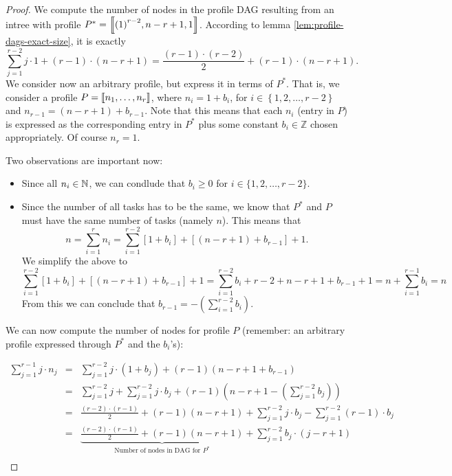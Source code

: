 \begin{proof}
  We compute the number of nodes in the profile DAG resulting from an intree with profile $P^*= \left\llbracket {(1)}^{r-2},n-r+1,1 \right\rrbracket$. According to lemma  \ref{lem:profile-dags-exact-size}, it is exactly
  \begin{equation*}
    \sum_{j=1}^{r-2} j\cdot 1 + (r-1)\cdot(n-r+1) = \frac{(r-1)\cdot(r-2)}{2} + (r-1)\cdot(n-r+1).
  \end{equation*}
  We consider now an arbitrary profile, but express it in terms of $P^*$. That is, we consider a profile $P=\left\llbracket n_1,\dots,n_r \right\rrbracket$, where $n_i = 1 + b_i$, for $i\in\left\{1,2,\dots,r-2\right\}$ and $n_{r-1} = (n-r+1) + b_{r-1}$. Note that this means that each $n_i$ (entry in $P$) is expressed as the corresponding entry in $P^*$ plus some constant $b_i\in\mathbb{Z}$ chosen appropriately. Of course $n_r = 1$.

  Two observations are important now:

  \begin{itemize}
  \item Since all $n_i \in \mathbb{N}$, we can condlude that $b_i \geq 0$ for $i\in\{1,2,\dots,r-2\}$.
  \item Since the number of all tasks has to be the same, we know that $P^*$ and $P$ must have the same number of tasks (namely $n$). This means that
    \begin{equation*}
      n = \sum_{i=1}^r n_i = \sum_{i=1}^{r-2} \left[ 1+b_i \right] + \left[(n-r+1)+b_{r-1} \right] + 1.
    \end{equation*}
    We simplify the above to
    \begin{equation*}
      \sum_{i=1}^{r-2} \left[ 1+b_i \right] + \left[(n-r+1)+b_{r-1} \right] + 1 =
      \sum_{i=1}^{r-2} b_i + r-2 + n-r+1+b_{r-1}+1 = 
      n + \sum_{i=1}^{r-1} b_i =
      n
    \end{equation*}
    From this we can conclude that $b_{r-1} = -(\sum_{i=1}^{r-2} b_i)$.
  \end{itemize}

  We can now compute the number of nodes for profile $P$ (remember: an arbitrary profile expressed through $P^*$ and the $b_i$'s):

  \begin{eqnarray*}
    \sum_{j=1}^{r-1} j \cdot n_j &=& \sum_{j=1}^{r-2} j\cdot (1+b_j) + (r-1)(n-r+1+b_{r-1}) \\
    &=& \sum_{j=1}^{r-2} j + \sum_{j=1}^{r-2} j\cdot b_j + (r-1)\left(n-r+1-(\sum_{j=1}^{r-2} b_j)\right) \\
    &=& \frac{(r-2)\cdot(r-1)}{2} + (r-1)(n-r+1) + \sum_{j=1}^{r-2} j\cdot b_j - \sum_{j=1}^{r-2} (r-1) \cdot b_j \\
    &=& \underbrace{\frac{(r-2)\cdot(r-1)}{2} + (r-1)(n-r+1)}_{\text{Number of nodes in DAG for $P^*$}} + \sum_{j=1}^{r-2} b_j \cdot (j-r+1) \\
  \end{eqnarray*}
  

\end{proof}
